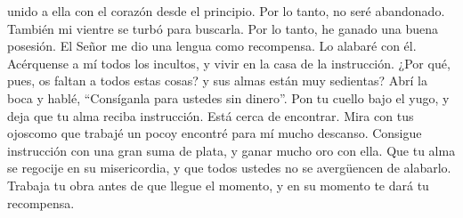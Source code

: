 unido a ella con el corazón desde el principio. Por lo tanto, no seré
abandonado.  También mi vientre se turbó para buscarla.
Por lo tanto, he ganado una buena posesión.  El Señor me
dio una lengua como recompensa. Lo alabaré con él. 
Acérquense a mí todos los incultos, y vivir en la casa de la
instrucción.  ¿Por qué, pues, os faltan a todos estas
cosas? y sus almas están muy sedientas?  Abrí la boca y
hablé, ``Consíganla para ustedes sin dinero''.  Pon tu
cuello bajo el yugo, y deja que tu alma reciba instrucción. Está cerca
de encontrar.  Mira con tus ojoscomo que trabajé un pocoy
encontré para mí mucho descanso.  Consigue instrucción
con una gran suma de plata, y ganar mucho oro con ella. 
Que tu alma se regocije en su misericordia, y que todos ustedes no se
avergüencen de alabarlo.  Trabaja tu obra antes de que
llegue el momento, y en su momento te dará tu recompensa.
